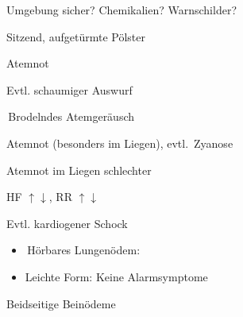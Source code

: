 {
\begin{ABCDESlide}
  \item[\ABCDE{1}] Umgebung sicher? Chemikalien?
  Warnschilder?
  \item[\ABCDE{2}] Sitzend, aufgetürmte Pölster
  \item[\ABCDE{4}] Atemnot
  \item[\ABCDE{A}] Evtl. schaumiger Auswurf
  \item[\ABCDE{B}] {\RedFlag}\,Brodelndes Atemgeräusch

  Atemnot (besonders im Liegen), evtl. {\RedFlag}\,Zyanose
  
  Atemnot im Liegen schlechter
  \item[\ABCDE{C}] HF $\uparrow\downarrow$, RR
  $\uparrow\downarrow$
  
  Evtl. kardiogener Schock
  \item[\ABCDE{=}]
  \begin{itemize}
    \item {\RedFlag}\,Hörbares Lungenödem:
    \item Leichte Form: Keine Alarmsymptome
  \end{itemize}
  \item[\ABCDE{\ldots}] Beidseitige Beinödeme
\end{ABCDESlide}
}
{}
{}
{}

